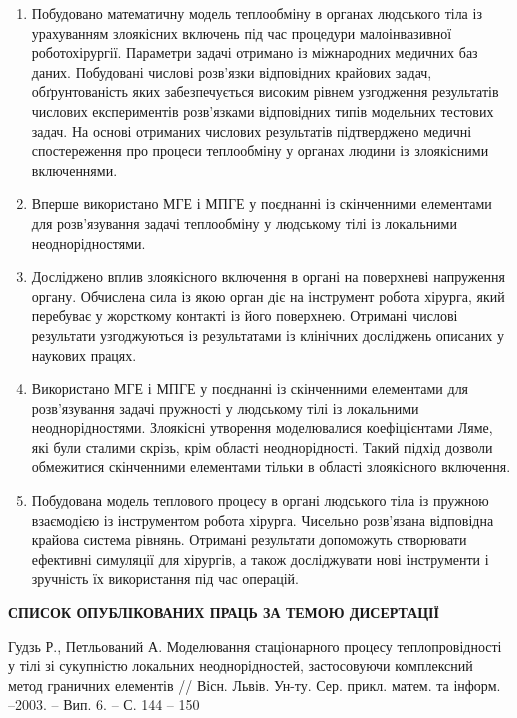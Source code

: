 \begin{enumerate}
  \item Побудовано математичну модель теплообміну в органах людського тіла із урахуванням злоякісних включень під час
  процедури малоінвазивної роботохірургії. Параметри задачі отримано із міжнародних медичних баз даних. Побудовані
  числові розв'язки відповідних крайових задач, обґрунтованість яких забезпечується високим рівнем узгодження
  результатів числових експериментів розв'язками відповідних типів модельних тестових задач. На основі отриманих
  числових результатів підтверджено медичні спостереження про процеси теплообміну у органах людини із злоякісними
  включеннями.
  \item Вперше використано МГЕ і МПГЕ у поєднанні із скінченними елементами для розв'язування задачі теплообміну у
  людському тілі із локальними неоднорідностями.
  \item Досліджено вплив злоякісного включення в органі на поверхневі напруження органу. Обчислена сила із якою орган
  діє на інструмент робота хірурга, який перебуває у жорсткому контакті із його поверхнею. Отримані числові результати
  узгоджуються із результатами із клінічних досліджень описаних у наукових працях.
  \item Використано МГЕ і МПГЕ у поєднанні із скінченними елементами для розв'язування задачі пружності у людському тілі
  із локальними неоднорідностями. Злоякісні утворення моделювалися коефіцієнтами Ляме, які були сталими скрізь, крім
  області неоднорідності. Такий підхід дозволи обмежитися скінченними елементами тільки в області злоякісного включення.
  \item Побудована модель теплового процесу в органі людського тіла із пружною взаємодією із інструментом робота 
  хірурга. Чисельно розв'язана відповідна крайова система рівнянь. Отримані результати допоможуть створювати ефективні
  симуляції для хірургів, а також досліджувати нові інструменти і зручність їх використання під час операцій.
\end{enumerate}

\begin{center}
    \textbf{СПИСОК ОПУБЛІКОВАНИХ ПРАЦЬ ЗА ТЕМОЮ ДИСЕРТАЦІЇ}
\end{center}

Гудзь Р., Петльований А. Моделювання стаціонарного процесу теплопровідності у тілі зі сукупністю локальних
неоднорідностей, застосовуючи комплексний метод граничних елементів // Вісн. Львів. Ун-ту. Сер. прикл. матем. та інформ.
–2003. – Вип. 6. – С. 144 – 150


